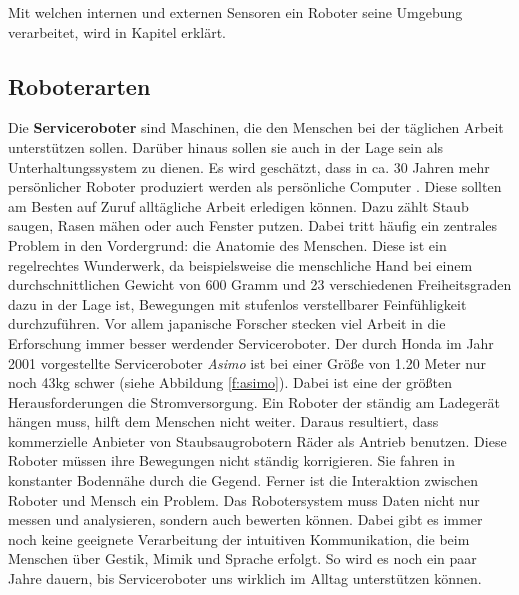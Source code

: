 Mit welchen internen und externen Sensoren ein Roboter seine Umgebung verarbeitet, wird in Kapitel  erklärt.


\subsection{Roboterarten}
Die \textbf{Serviceroboter} sind Maschinen, die den Menschen bei der täglichen Arbeit unterstützen sollen. Darüber hinaus sollen sie auch in der Lage sein als Unterhaltungssystem zu dienen. Es wird geschätzt, dass in ca. 30 Jahren mehr persönlicher Roboter produziert werden als persönliche Computer \cite{Haun2007}.
Diese sollten am Besten auf Zuruf alltägliche Arbeit erledigen können. Dazu zählt Staub saugen, Rasen mähen oder auch Fenster putzen. Dabei tritt häufig ein zentrales Problem in den Vordergrund: die Anatomie des Menschen. Diese ist ein regelrechtes Wunderwerk, da beispielsweise die menschliche Hand bei einem durchschnittlichen Gewicht von 600 Gramm und 23 verschiedenen Freiheitsgraden dazu in der Lage ist, Bewegungen mit stufenlos verstellbarer Feinfühligkeit durchzuführen. Vor allem japanische Forscher stecken viel Arbeit in die Erforschung immer besser werdender Serviceroboter. Der durch Honda im Jahr 2001 vorgestellte Serviceroboter \textit{Asimo} ist bei einer Größe von 1.20 Meter nur noch 43kg schwer (siehe Abbildung \ref{f:asimo}).
Dabei ist eine der größten Herausforderungen die Stromversorgung. Ein Roboter der ständig am Ladegerät hängen muss, hilft dem Menschen nicht weiter. Daraus resultiert, dass kommerzielle Anbieter von Staubsaugrobotern Räder als Antrieb benutzen. Diese Roboter müssen ihre Bewegungen nicht ständig korrigieren. Sie fahren in konstanter Bodennähe durch die Gegend. Ferner ist die Interaktion zwischen Roboter und Mensch ein Problem. Das Robotersystem muss Daten nicht nur messen und analysieren, sondern auch bewerten können. Dabei gibt es immer noch keine geeignete Verarbeitung der intuitiven Kommunikation, die beim Menschen über Gestik, Mimik und Sprache erfolgt. So wird es noch ein paar Jahre dauern, bis Serviceroboter uns wirklich im Alltag unterstützen können.
